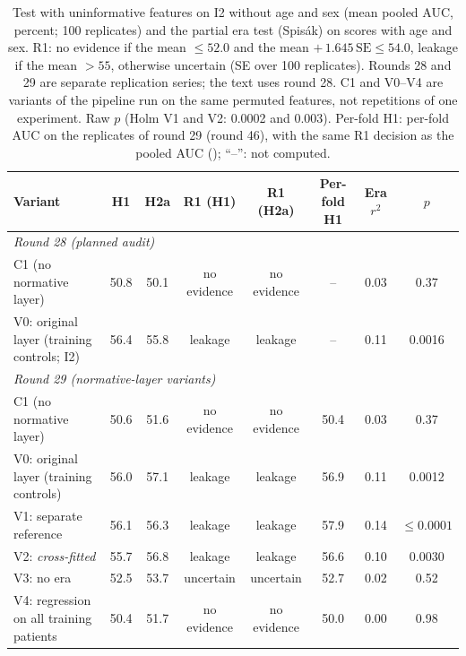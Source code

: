 \begin{table}[t]
\caption{Test with uninformative features on I2 without age and sex (mean pooled AUC, percent; 100 replicates) and the partial era test (Spis\'ak) on scores with age and sex. R1: no evidence if the mean $\leq 52.0$ and the mean $+\,1.645\,\mathrm{SE} \leq 54.0$, leakage if the mean $> 55$, otherwise uncertain (SE over 100 replicates). Rounds 28 and 29 are separate replication series; the text uses round 28. C1 and V0--V4 are variants of the pipeline run on the same permuted features, not repetitions of one experiment. Raw $p$ (Holm V1 and V2: 0.0002 and 0.003). Per-fold H1: per-fold AUC on the replicates of round 29 (round 46), with the same R1 decision as the pooled AUC (); ``--'': not computed.}\label{tab:kebocoran_badan}
\centering\scriptsize
\setlength{\tabcolsep}{2.5pt}
\begin{tabular}{p{}ccccccc}
\toprule
Variant & H1 & H2a & R1 (H1) & R1 (H2a) & Per-fold H1 & Era $r^2$ & $p$ \\
\midrule
\multicolumn{8}{l}{\textit{Round 28 (planned audit)}} \\
C1 (no normative layer) & 50.8 & 50.1 & no evidence & no evidence & -- & 0.03 & 0.37 \\
V0: original layer (training controls; I2) & 56.4 & 55.8 & leakage & leakage & -- & 0.11 & 0.0016 \\
\midrule
\multicolumn{8}{l}{\textit{Round 29 (normative-layer variants)}} \\
C1 (no normative layer) & 50.6 & 51.6 & no evidence & no evidence & 50.4 & 0.03 & 0.37 \\
V0: original layer (training controls) & 56.0 & 57.1 & leakage & leakage & 56.9 & 0.11 & 0.0012 \\
V1: separate reference & 56.1 & 56.3 & leakage & leakage & 57.9 & 0.14 & $\leq 0.0001$ \\
V2: \textit{cross-fitted} & 55.7 & 56.8 & leakage & leakage & 56.6 & 0.10 & 0.0030 \\
V3: no era & 52.5 & 53.7 & uncertain & uncertain & 52.7 & 0.02 & 0.52 \\
V4: regression on all training patients & 50.4 & 51.7 & no evidence & no evidence & 50.0 & 0.00 & 0.98 \\
\bottomrule
\end{tabular}
\end{table}
